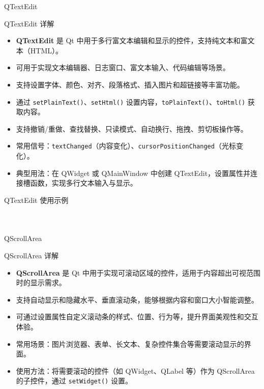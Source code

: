 \documentclass[UTF8,aspectratio=169]{beamer}
\begin{document}
\begin{frame}{QTextEdit}
    \begin{ytublock}{QTextEdit 详解}
        \begin{itemize}
            \item \textbf{QTextEdit} 是 Qt 中用于多行富文本编辑和显示的控件，支持纯文本和富文本（HTML）。
            \item 可用于实现文本编辑器、日志窗口、富文本输入、代码编辑等场景。
            \item 支持设置字体、颜色、对齐、段落格式、插入图片和超链接等丰富功能。
            \item 通过 \texttt{setPlainText()}、\texttt{setHtml()} 设置内容，\texttt{toPlainText()}、\texttt{toHtml()} 获取内容。
            \item 支持撤销/重做、查找替换、只读模式、自动换行、拖拽、剪切板操作等。
            \item 常用信号：\texttt{textChanged}（内容变化）、\texttt{cursorPositionChanged}（光标变化）。
            \item 典型用法：在 QWidget 或 QMainWindow 中创建 QTextEdit，设置属性并连接槽函数，实现多行文本输入与显示。
        \end{itemize}
    \end{ytublock}
\end{frame}

\begin{frame}[fragile]{QTextEdit 使用示例}
    \begin{columns}
        \begin{column}{0.48\textwidth}
            \inputminted[firstline=1,lastline=18]{cpp}{code/qt_textedit_example.cpp}
        \end{column}
        \begin{column}{0.48\textwidth}
            \inputminted[firstline=19,lastline=36]{cpp}{code/qt_textedit_example.cpp}
        \end{column}
    \end{columns}
\end{frame}

\begin{frame}{QScrollArea}
    \begin{ytublock}{QScrollArea 详解}
        \begin{itemize}
            \item \textbf{QScrollArea} 是 Qt 中用于实现可滚动区域的控件，适用于内容超出可视范围时的显示需求。
            \item 支持自动显示和隐藏水平、垂直滚动条，能够根据内容和窗口大小智能调整。
            \item 可通过设置属性自定义滚动条的样式、位置、行为等，提升界面美观性和交互体验。
            \item 常用场景：图片浏览器、表单、长文本、复杂控件集合等需要滚动显示的界面。
            \item 使用方法：将需要滚动的控件（如 QWidget、QLabel 等）作为 QScrollArea 的子控件，通过 \texttt{setWidget()} 设置。
        \end{itemize}
    \end{ytublock}
\end{frame}
\end{document}
